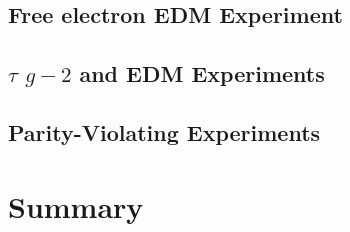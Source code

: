 \subsection{Free electron EDM Experiment}\label{sec:cl:eEDM}

\subsection{$\tau$ $g-2$ and EDM Experiments}\label{sec:cl:taug-2exp}

\subsection{Parity-Violating Experiments}\label{sec:cl:pve}


\section{Summary}\label{sec:cl:gm2edmdisc}





